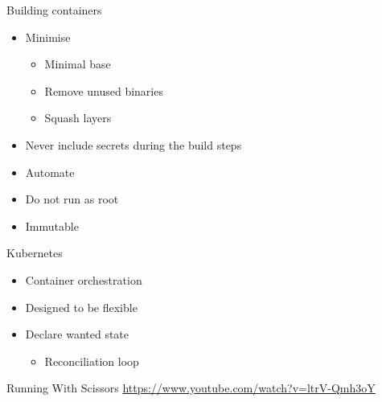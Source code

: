 \documentclass{dcpresentation}
\begin{document}

\begin{frame}{Building containers}
 \begin{itemize}
  \item Minimise
  \begin{itemize}
   \item Minimal base %
   \item Remove unused binaries
   \item Squash layers %
  \end{itemize}
  \item Never include secrets during the build steps
  \item Automate
  \item Do not run as root
  \item Immutable
 \end{itemize}
\end{frame}


\begin{frame}{Kubernetes}
  \begin{itemize}
  \item Container orchestration
  \item Designed to be flexible
  \item Declare wanted state
    \begin{itemize}
    \item Reconciliation loop
    \end{itemize}
  \end{itemize}
\end{frame}


\begin{frame}{Running With Scissors}
  \url{https://www.youtube.com/watch?v=ltrV-Qmh3oY}
\end{frame}

\end{document}

